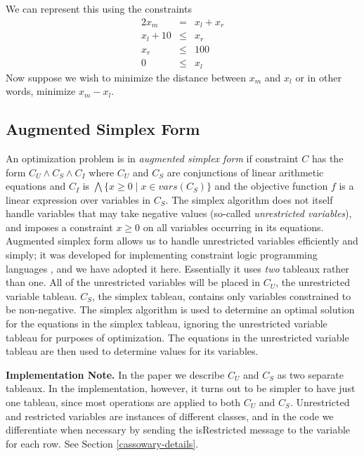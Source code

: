 \documentclass{article}
\begin{document}
We can represent this using the constraints
$$\begin{array}{rcl}
2 x_m &=& x_l + x_r \\
x_l + 10 &\leq &x_r \\
x_r &\leq& 100 \\
0 &\leq& x_l
\end{array}$$
Now suppose  we wish to minimize the distance between
$x_m$ and $x_l$ or in other words, minimize $x_m - x_l$.

\subsection{Augmented Simplex Form}
\label{augmented-simplex-form}

An optimization problem is in \emph{augmented simplex form} if constraint
$C$ has the form $C_U \wedge C_S \wedge C_I$ where $C_U$ and $C_S$ are
conjunctions of linear arithmetic equations and $C_I$ is $\bigwedge \{ x
\geq 0 \mid x \in vars(C_S)\}$ and the objective function $f$ is a linear
expression over variables in $C_S$\@.  The simplex algorithm does not itself
handle variables that may take negative values (so-called {\em
unrestricted variables}), and imposes a constraint $x \geq 0$ on all
variables occurring in its equations.  Augmented simplex form allows us to
handle unrestricted variables efficiently and simply; it was developed for
implementing constraint logic programming languages
\cite{marriott-stuckey-book}, and we have adopted it here.  Essentially it
uses {\em two} tableaux rather than one.  All of the unrestricted
variables will be placed in $C_U$, the unrestricted variable tableau.
$C_S$, the simplex tableau, contains only variables constrained to be
non-negative.  The simplex algorithm is used to determine an optimal
solution for the equations in the simplex tableau, ignoring the
unrestricted variable tableau for purposes of optimization.  The equations
in the unrestricted variable tableau are then used to determine values for
its variables.

{\bf Implementation Note.}  In the paper we describe $C_U$ and $C_S$ as
two separate tableaux.  In the implementation, however, it turns out to be
simpler to have just one tableau, since most operations are applied to both
$C_U$ and $C_S$.  Unrestricted and restricted variables are instances of
different classes, and in the code
we differentiate when necessary by sending the {\sf
isRestricted} message to the variable for each row.  See Section
\ref{cassowary-details}.
\end{document}
